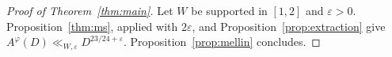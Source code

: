 \begin{proof}[Proof of Theorem~\ref{thm:main}]
Let $W$ be supported in $[1,2]$ and $\varepsilon>0$.
Proposition~\ref{thm:ms}, applied with $2\varepsilon$, and Proposition~\ref{prop:extraction}
give $A^\varphi(D)\ll_{W,\varepsilon}D^{23/24+\varepsilon}$. Proposition~\ref{prop:mellin}
concludes.
\end{proof}

